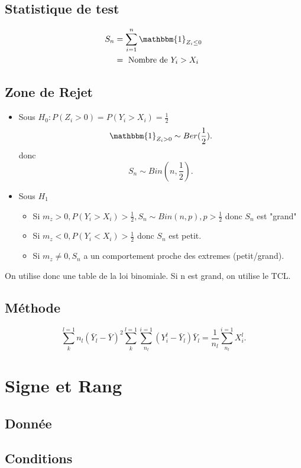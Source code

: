 \documentclass{article}
\theoremstyle{plain}%
\theoremstyle{definition}
\theoremstyle{remark}
\begin{document}
\subsection*{Statistique de test}
\begin{align*}
    S_n &= \sum_{i=1}^{n}\mathbbm{1}_{Z_i \leq 0} \\
    &= \text{ Nombre de } Y_i > X_i
\end{align*}

\subsection*{Zone de Rejet}
\begin{itemize}
    \item Sous $ H_0 : P(Z_i > 0) = P(Y_i > X_i) = \frac{1}{2} $ 
    \[
        \mathbbm{1}_{Z_i > 0} \sim Ber(\frac{1}{2})
    .\]
    donc 
    \[
        S_n \sim Bin(n,\frac{1}{2})
    .\]

    \item Sous $ H_1 $ \begin{itemize}
        \item Si $ m_z > 0, P(Y_i > X_i) > \frac{1}{2}, S_n \sim Bin(n,p), p> \frac{1}{2} $ donc $ S_n $ est "grand"
        \item Si $ m_z < 0, P(Y_i < X_i) > \frac{1}{2} $ donc $ S_n $ est petit.
        \item Si $ m_z \neq  0, S_n $ a un comportement proche des extremes (petit/grand).
    \end{itemize}
\end{itemize}

On utilise donc une table de la loi binomiale. Si n est grand, on utilise le TCL.

\subsection*{Méthode}
\[
    \sum_{k}^{l=1}n_l(\bar{Y}_l - \bar{Y})^2
    \sum_{k}^{l=1}\sum_{n_l}^{i=1}(Y_i^l - \bar{Y}_l)
    \bar{Y}_l = \frac{1}{n_l}\sum_{n_l}^{i=1}X_i^l
.\]

\section{Signe et Rang}
\subsection*{Donnée}
\subsection*{Conditions}
\end{document}
